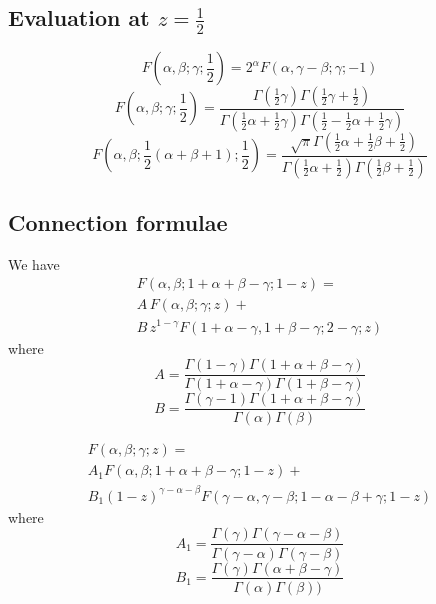 \documentclass[10pt, oneside, reqno]{amsart}
\theoremstyle{plain}%
\theoremstyle{definition}
\theoremstyle{remark}
\begin{document}
\subsection{Evaluation at $z = \frac{1}{2}$} %
\label{sub:evaluation_at_z_1_2_}
    \[
        F(\alpha, \beta; \gamma; \frac{1}{2}) = 2^\alpha F(\alpha, \gamma - \beta; \gamma; -1)
    \]
    \[
        F(\alpha, \beta; \gamma; \frac{1}{2}) = \frac{\Gamma(\frac{1}{2}\gamma) \Gamma(\frac{1}{2}\gamma + \frac{1}{2})}{\Gamma(\frac{1}{2}\alpha + \frac{1}{2}\gamma)\Gamma(\frac{1}{2} - \frac{1}{2}\alpha + \frac{1}{2}\gamma)}
    \]
    \[
        F(\alpha, \beta; \frac{1}{2}(\alpha + \beta +1); \frac{1}{2}) = \frac{ \sqrt{\pi} \Gamma(\frac{1}{2}\alpha + \frac{1}{2}\beta + \frac{1}{2})}{\Gamma(\frac{1}{2}\alpha + \frac{1}{2})\Gamma(\frac{1}{2}\beta + \frac{1}{2})}
    \]



\subsection{Connection formulae} %
\label{sub:connection_formulae}
We have \begin{align*}
    F(\alpha, \beta; 1 + \alpha + \beta - \gamma; 1 - z) = \\
     A \,F(\alpha, \beta; \gamma ;z) + \\
     B \, z^{1 - \gamma} F(1 + \alpha - \gamma, 1+ \beta - \gamma; 2 - \gamma; z)
\end{align*}
where \[
    A = \frac{\Gamma(1 - \gamma)\Gamma(1 + \alpha + \beta - \gamma)}{\Gamma(1 + \alpha - \gamma)\Gamma(1 + \beta - \gamma)}
\]\[
    B = \frac{\Gamma(\gamma - 1)\Gamma(1 + \alpha + \beta - \gamma)}{\Gamma(\alpha)\Gamma(\beta)}
\]

\begin{align*}
    F(\alpha, \beta; \gamma ; z) = \\
    A_1 F(\alpha, \beta; 1 + \alpha + \beta - \gamma; 1 -z) + \\
     B_1 (1 - z)^{\gamma - \alpha - \beta} F(\gamma - \alpha, \gamma - \beta; 1 - \alpha - \beta + \gamma; 1 - z)   
\end{align*}
where \[
    A_1 = \frac{\Gamma(\gamma)\Gamma(\gamma - \alpha - \beta)}{\Gamma(\gamma - \alpha)\Gamma(\gamma - \beta)}
\]\[
    B_1 = \frac{\Gamma(\gamma)\Gamma(\alpha + \beta - \gamma)}{\Gamma(\alpha)\Gamma(\beta))}
\]
\end{document}
